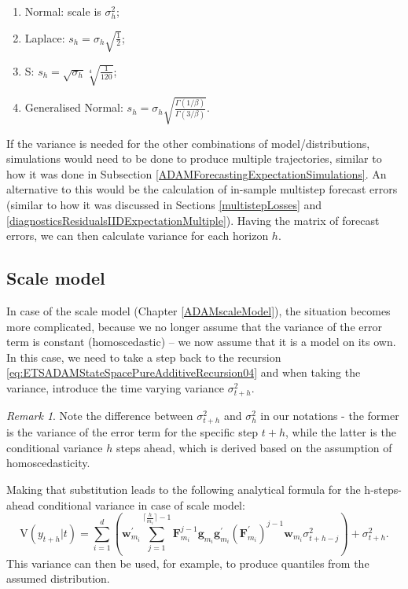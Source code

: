 \documentclass[]{book}
\providecommand{\tightlist}{%
  \setlength{\itemsep}{0pt}\setlength{\parskip}{0pt}}
\theoremstyle{definition}
\theoremstyle{definition}
\theoremstyle{definition}
\theoremstyle{definition}
\theoremstyle{remark}
\newtheorem*{remark}{Remark}
\begin{document}
\begin{enumerate}
\def\labelenumi{\arabic{enumi}.}
\tightlist
\item
  Normal: scale is \(\sigma^2_h\);
\item
  Laplace: \(s_h = \sigma_h \sqrt{\frac{1}{2}}\);
\item
  S: \(s_h = \sqrt{\sigma_h}\sqrt[4]{\frac{1}{120}}\);
\item
  Generalised Normal: \(s_h = \sigma_h \sqrt{\frac{\Gamma(1/\beta)}{\Gamma(3/\beta)}}\).
\end{enumerate}

If the variance is needed for the other combinations of model/distributions, simulations would need to be done to produce multiple trajectories, similar to how it was done in Subsection \ref{ADAMForecastingExpectationSimulations}. An alternative to this would be the calculation of in-sample multistep forecast errors (similar to how it was discussed in Sections \ref{multistepLosses} and \ref{diagnosticsResidualsIIDExpectationMultiple}). Having the matrix of forecast errors, we can then calculate variance for each horizon \(h\).

\hypertarget{scale-model}{%
\subsection{Scale model}\label{scale-model}}

In case of the scale model (Chapter \ref{ADAMscaleModel}), the situation becomes more complicated, because we no longer assume that the variance of the error term is constant (homoscedastic) -- we now assume that it is a model on its own. In this case, we need to take a step back to the recursion \eqref{eq:ETSADAMStateSpacePureAdditiveRecursion04} and when taking the variance, introduce the time varying variance \(\sigma_{t+h}^2\).

\begin{remark}
Note the difference between \(\sigma_{t+h}^2\) and \(\sigma_{h}^2\) in our notations - the former is the variance of the error term for the specific step \(t+h\), while the latter is the conditional variance \(h\) steps ahead, which is derived based on the assumption of homoscedasticity.
\end{remark}

Making that substitution leads to the following analytical formula for the h-steps-ahead conditional variance in case of scale model:
\begin{equation}
    \text{V}(y_{t+h}|t) = \sum_{i=1}^d \left(\mathbf{w}_{m_i}^\prime \sum_{j=1}^{\lceil\frac{h}{m_i}\rceil-1} \mathbf{F}_{m_i}^{j-1} \mathbf{g}_{m_i} \mathbf{g}^\prime_{m_i} (\mathbf{F}_{m_i}^\prime)^{j-1} \mathbf{w}_{m_i} \sigma_{t+h-j}^2 \right) + \sigma_{t+h}^2 .
    \label{eq:ETSADAMFullWithScaleModelVariance}
\end{equation}
This variance can then be used, for example, to produce quantiles from the assumed distribution.
\end{document}
